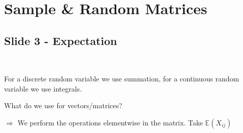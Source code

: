 \section{Sample \& Random Matrices}
\par\bigskip
\subsection{Slide 3 - Expectation}\hfill\\
\par\bigskip
\noindent For a discrete random variable we use summation, for a continuous random variable we use integrals.\par
\noindent What do we use for vectors/matrices?
\par\bigskip
\noindent$\Rightarrow$ We perform the operations elementwise in the matrix. Take $\mathbb{E}(X_{ij})$ 
\par\bigskip
